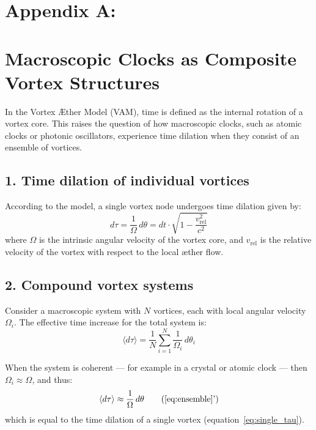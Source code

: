 \section*{Appendix A:}
\label{appendix:ClocksInVortexStructures}
\section*{Macroscopic Clocks as Composite Vortex Structures}
In the Vortex Æther Model (VAM), time is defined as the internal rotation of a vortex core. This raises the question of how macroscopic clocks, such as atomic clocks or photonic oscillators, experience time dilation when they consist of an ensemble of vortices.

\subsection*{1. Time dilation of individual vortices}

According to the model, a single vortex node undergoes time dilation given by:
\begin{equation}
d\tau = \frac{1}{\Omega} \, d\theta = dt \cdot \sqrt{1 - \frac{v_\text{rel}^2}{c^2}} \label{eq:single_tau}
\end{equation}
where \( \Omega \) is the intrinsic angular velocity of the vortex core, and \( v_\text{rel} \) is the relative velocity of the vortex with respect to the local æther flow.

\subsection*{2. Compound vortex systems}

Consider a macroscopic system with \( N \) vortices, each with local angular velocity \( \Omega_i \). The effective time increase for the total system is:
\begin{equation}
\langle d\tau \rangle = \frac{1}{N} \sum_{i=1}^{N} \frac{1}{\Omega_i} \, d\theta_i \label{eq:ensemble}
\end{equation}

When the system is coherent — for example in a crystal or atomic clock — then \( \Omega_i \approx \Omega \), and thus:
\begin{equation}
\langle d\tau \rangle \approx \frac{1}{\Omega} \, d\theta \tag{\ref{eq:ensemble}'}
\end{equation}
which is equal to the time dilation of a single vortex (equation~\ref{eq:single_tau}).

